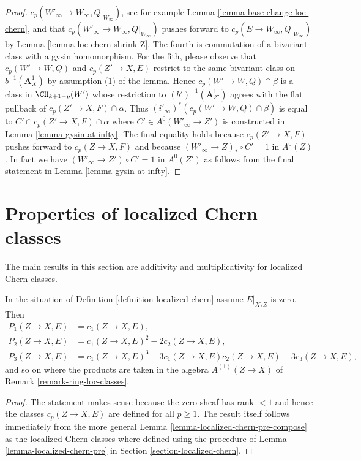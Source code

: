 \begin{proof}
$c_p(W'_\infty \to W_\infty, Q|_{W_\infty})$, see for example
Lemma \ref{lemma-base-change-loc-chern}, and that
$c_p(W'_\infty \to W_\infty, Q|_{W_\infty})$
pushes forward to $c_p(E \to W_\infty, Q|_{W_\infty})$
by Lemma \ref{lemma-loc-chern-shrink-Z}.
The fourth is commutation of a bivariant class with
a gysin homomorphism. For the fith, please observe that
$c_p(W' \to W, Q)$ and $c_p(Z' \to X, E)$ restrict to the
same bivariant class on $b^{-1}(\mathbf{A}^1_X)$ by
assumption (1) of the lemma. Hence $c_p(W' \to W, Q) \cap \beta$
is a class in $\CH_{k + 1 - p}(W')$ whose restriction to
$(b')^{-1}(\mathbf{A}^1_{Z'})$ agrees with the flat pullback
of $c_p(Z' \to X, F) \cap \alpha$. Thus
$(i'_\infty)^*(c_p(W' \to W, Q) \cap \beta)$ is equal to
$C' \cap c_p(Z' \to X, F) \cap \alpha$ where
$C' \in A^0(W'_\infty \to Z')$ is constructed in
Lemma \ref{lemma-gysin-at-infty}.
The final equality holds because $c_p(Z' \to X, F)$ pushes forward
to $c_p(Z \to X, F)$ and because $(W'_\infty \to Z)_* \circ C' = 1$ in $A^0(Z)$.
In fact we have $(W'_\infty \to Z') \circ C' = 1$ in $A^0(Z')$ as
follows from the final statement in Lemma \ref{lemma-gysin-at-infty}.
\end{proof}







\section{Properties of localized Chern classes}
\label{section-properties-loc-chern}

\noindent
The main results in this section are additivity and multiplicativity
for localized Chern classes.

\begin{lemma}
\label{lemma-loc-chern-character}
In the situation of Definition \ref{definition-localized-chern}
assume $E|_{X \setminus Z}$ is zero. Then
\begin{align*}
P_1(Z \to X, E) & = c_1(Z \to X, E), \\
P_2(Z \to X, E) & = c_1(Z \to X, E)^2 - 2c_2(Z \to X, E), \\
P_3(Z \to X, E) & = c_1(Z \to X, E)^3 - 3c_1(Z \to X, E)c_2(Z \to X, E)
+ 3c_3(Z \to X, E),
\end{align*}
and so on where the products are taken in the algebra $A^{(1)}(Z \to X)$
of Remark \ref{remark-ring-loc-classes}.
\end{lemma}

\begin{proof}
The statement makes sense because the zero sheaf has rank $< 1$ and
hence the classes $c_p(Z \to X, E)$ are defined for all $p \geq 1$.
The result itself follows immediately from the more general
Lemma \ref{lemma-localized-chern-pre-compose} as the localized Chern
classes where defined using the procedure of
Lemma \ref{lemma-localized-chern-pre}
in Section \ref{section-localized-chern}.
\end{proof}

